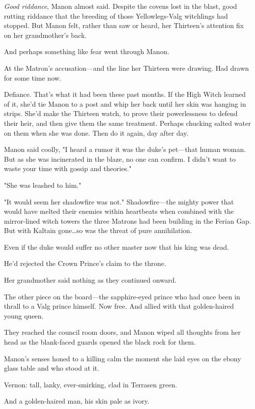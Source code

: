 \emph{Good riddance}, Manon almost said.
Despite the covens lost in the blast, good rutting riddance that the breeding of those Yellowlegs-Valg witchlings had stopped.
But Manon felt, rather than saw or heard, her Thirteen's attention fix on her grandmother's back.

And perhaps something like fear went through Manon.

At the Matron's accusation---and the line her Thirteen were drawing.
Had drawn for some time now.

Defiance.
That's what it had been these past months.
If the High Witch learned of it, she'd tie Manon to a post and whip her back until her skin was hanging in strips.
She'd make the Thirteen watch, to prove their powerlessness to defend their heir, and then give them the same treatment.
Perhaps chucking salted water on them when she was done.
Then do it again, day after day.

Manon said coolly, "I heard a rumor it was the duke's pet---that human woman.
But as she was incinerated in the blaze, no one can confirm.
I didn't want to waste your time with gossip and theories."

"She was leashed to him."

"It would seem her shadowfire was not."
Shadowfire---the mighty power that would have melted their enemies within heartbeats when combined with the mirror-lined witch towers the three Matrons had been building in the Ferian Gap.
But with Kaltain gone\ldots so was the threat of pure annihilation.

Even if the duke would suffer no other master now that his king was dead.

He'd rejected the Crown Prince's claim to the throne.

Her grandmother said nothing as they continued onward.

The other piece on the board---the sapphire-eyed prince who had once been in thrall to a Valg prince himself.
Now free.
And allied with that golden-haired young queen.

They reached the council room doors, and Manon wiped all thoughts from her head as the blank-faced guards opened the black rock for them.

Manon's senses honed to a killing calm the moment she laid eyes on the ebony glass table and who stood at it.

Vernon: tall, lanky, ever-smirking, clad in Terrasen green.

And a golden-haired man, his skin pale as ivory.

